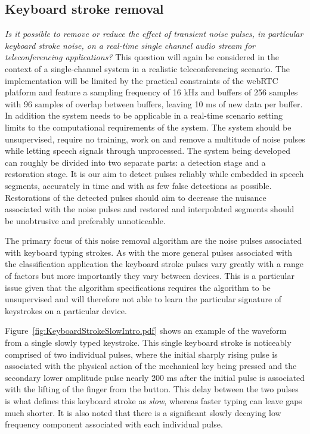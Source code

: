 \subsection{Keyboard stroke removal}
\emph{Is it possible to remove or reduce the effect of transient noise pulses, in particular keyboard stroke noise, on a real-time single channel audio stream for teleconferencing applications?}
This question will again be considered in the context of a single-channel system in a realistic teleconferencing scenario. The implementation will be limited by the practical constraints of the webRTC platform and feature a sampling frequency of 16 kHz and buffers of 256 samples with 96 samples of overlap between buffers, leaving 10 ms of new data per buffer. In addition the system needs to be applicable in a real-time scenario setting limits to the computational requirements of the system. The system should be unsupervised, require no training, work on and remove a multitude of noise pulses while letting speech signals through unprocessed. The system being developed can roughly be divided into two separate parts: a detection stage and a restoration stage. It is our aim to detect pulses reliably while embedded in speech segments, accurately in time and with as few false detections as possible. Restorations of the detected pulses should aim to decrease the nuisance associated with the noise pulses and restored and interpolated segments should be unobtrusive and preferably unnoticeable.

The primary focus of this noise removal algorithm are the noise pulses associated with keyboard typing strokes. As with the more general pulses associated with the classification application the keyboard stroke pulses vary greatly with a range of factors but more importantly they vary between devices. This is a particular issue given that the algorithm specifications requires the algorithm to be unsupervised and will therefore not able to learn the particular signature of keystrokes on a particular device. 

Figure~\ref{fig:KeyboardStrokeSlowIntro.pdf} shows an example of the waveform from a single slowly typed keystroke. This single keyboard stroke is noticeably comprised of two individual pulses, where the initial sharply rising pulse is associated with the physical action of the mechanical key being pressed and the secondary lower amplitude pulse nearly 200 ms after the initial pulse is associated with the lifting of the finger from the button. This delay between the two pulses is what defines this keyboard stroke as \emph{slow}, whereas faster typing can leave gaps much shorter. It is also noted that there is a significant slowly decaying low frequency component associated with each individual pulse. 

